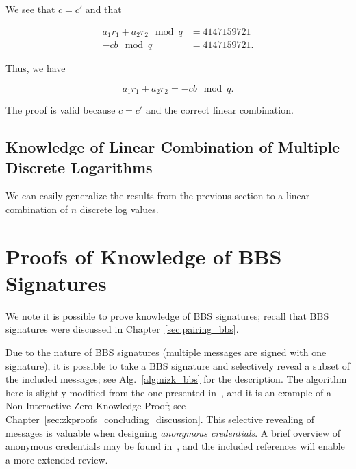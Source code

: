\begin{example}
\noindent
We see that $c=c'$ and that

\begin{align}
    a_{1}r_{1} + a_{2}r_{2} \mod q &= 4147159721 \nonumber\\
    -cb \mod q &= 4147159721.
\end{align}

\noindent
Thus, we have

\begin{equation}
    a_{1}r_{1} + a_{2}r_{2} = -cb \mod q.
\end{equation}

\noindent
The proof is valid because $c=c'$ and the correct linear combination.


\end{example}

\subsection{Knowledge of Linear Combination of Multiple Discrete Logarithms}

We can easily generalize the results from the previous section
to a linear combination of $n$ \gls{discrete log} values.



\section{Proofs of Knowledge of BBS Signatures}
\label{sec:zkproofs_bbs}

We note it is possible to prove knowledge of BBS signatures;
recall that BBS signatures were discussed in Chapter~\ref{sec:pairing_bbs}.

Due to the nature of BBS signatures
(multiple messages are signed with one signature),
it is possible to take a BBS signature
and selectively reveal a subset of the included messages;
see Alg.~\ref{alg:nizk_bbs} for the description.
The algorithm here is slightly modified
from the one presented in~\cite[Section 5]{cryptoeprint:2023/275},
and it is an example of a
Non-Interactive Zero-Knowledge Proof;
see Chapter~\ref{sec:zkproofs_concluding_discussion}.
This selective revealing of messages is valuable when designing
\emph{anonymous credentials}.
A brief overview of anonymous credentials may be found
in~\cite[Introduction]{cryptoeprint:2023/275}, and the included references
will enable a more extended review.





